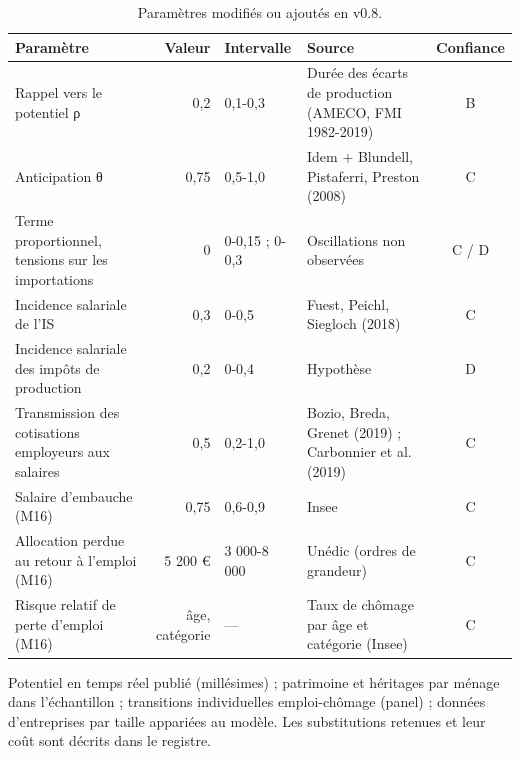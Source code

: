 \begin{table}[htbp]\centering\scriptsize
\caption{Paramètres modifiés ou ajoutés en v0.8.}
\begin{tabularx}{\linewidth}{@{}l r l L c@{}}\toprule
Paramètre & Valeur & Intervalle & Source & Confiance\\ \midrule
Rappel vers le potentiel ρ & 0,2 & 0,1-0,3 & Durée des écarts de production (AMECO, FMI 1982-2019) & B\\
Anticipation θ & 0,75 & 0,5-1,0 & Idem + Blundell, Pistaferri, Preston (2008) & C\\
Terme proportionnel, tensions sur les importations & 0 & 0-0,15 ; 0-0,3 & Oscillations non observées & C / D\\
Incidence salariale de l'IS & 0,3 & 0-0,5 & Fuest, Peichl, Siegloch (2018) & C\\
Incidence salariale des impôts de production & 0,2 & 0-0,4 & Hypothèse & D\\
Transmission des cotisations employeurs aux salaires & 0,5 & 0,2-1,0 & Bozio, Breda, Grenet (2019) ; Carbonnier et al. (2019) & C\\
Salaire d'embauche (M16) & 0,75 & 0,6-0,9 & Insee & C\\
Allocation perdue au retour à l'emploi (M16) & 5 200 € & 3 000-8 000 & Unédic (ordres de grandeur) & C\\
Risque relatif de perte d'emploi (M16) & âge, catégorie & — & Taux de chômage par âge et catégorie (Insee) & C\\ \bottomrule
\end{tabularx}
\end{table}

\begin{limites}
Potentiel en temps réel publié (millésimes) ; patrimoine et héritages par ménage dans l'échantillon ; transitions
individuelles emploi-chômage (panel) ; données d'entreprises par taille appariées au modèle. Les substitutions
retenues et leur coût sont décrits dans le registre.
\end{limites}
